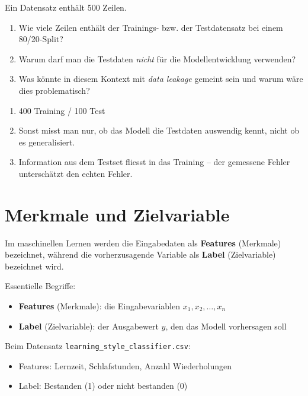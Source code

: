 \begin{myexercise}
Ein Datensatz enthält 500 Zeilen.
\begin{enumerate}
    \item Wie viele Zeilen enthält der Trainings- bzw. der Testdatensatz bei einem 80/20-Split?
    \item Warum darf man die Testdaten \emph{nicht} für die Modellentwicklung verwenden?
    \item Was könnte in diesem Kontext mit \emph{data leakage} gemeint sein und warum wäre dies problematisch?
\end{enumerate}
\begin{myanswer}
\begin{enumerate}
    \item 400 Training / 100 Test \quad
    \item Sonst misst man nur, ob das Modell die Testdaten auswendig kennt, nicht ob es generalisiert. \quad
    \item Information aus dem Testset fliesst in das Training -- der gemessene Fehler unterschätzt den echten Fehler.
\end{enumerate}
\end{myanswer}
\end{myexercise}

\section{Merkmale und Zielvariable}
Im maschinellen Lernen werden die Eingabedaten als \textbf{Features} (Merkmale) bezeichnet, während die vorherzusagende Variable als \textbf{Label} (Zielvariable) bezeichnet wird.
\begin{mydefinition}
    Essentielle Begriffe:
\begin{itemize}
    \item \textbf{Features} (Merkmale): die Eingabevariablen $x_1, x_2, \ldots, x_n$
    \item \textbf{Label} (Zielvariable): der Ausgabewert $y$, den das Modell vorhersagen soll
\end{itemize}
\end{mydefinition}

\begin{myexample}
Beim Datensatz \texttt{learning\_style\_classifier.csv}:
\begin{itemize}
    \item Features: Lernzeit, Schlafstunden, Anzahl Wiederholungen
    \item Label: Bestanden (1) oder nicht bestanden (0)
\end{itemize}
\end{myexample}

